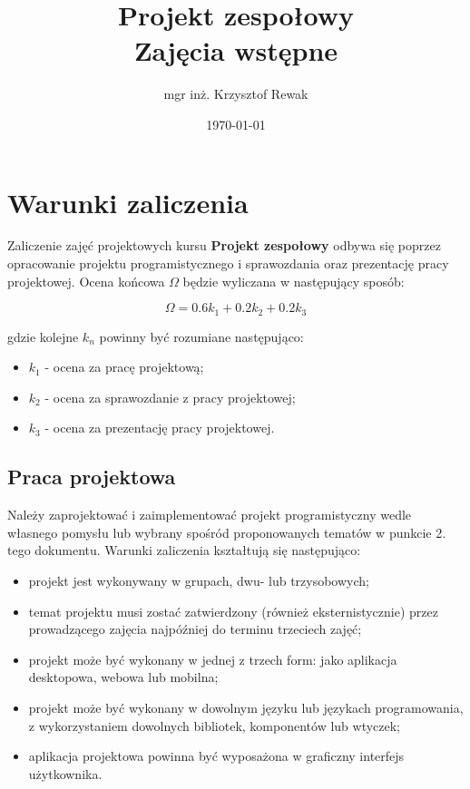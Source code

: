 \documentclass{article}
\title{
	Projekt zespołowy \\
	\Huge{Zajęcia wstępne}
}
\author{mgr inż. Krzysztof Rewak}
\date{\today}
\begin{document}
	\maketitle

	\section{Warunki zaliczenia}
	Zaliczenie zajęć projektowych kursu \textbf{Projekt zespołowy} odbywa się poprzez opracowanie projektu programistycznego i sprawozdania oraz prezentację pracy projektowej. Ocena końcowa $\Omega$ będzie wyliczana w następujący sposób:
	
	\begin{equation} \Omega = 0.6 k_1 + 0.2 k_2 + 0.2 k_3 \label{omega} \end{equation}
	
	gdzie kolejne $k_n$ powinny być rozumiane następująco:
	
	\begin{itemize}
		\item $k_1$ - ocena za pracę projektową;
		\item $k_2$ - ocena za sprawozdanie z pracy projektowej;
		\item $k_3$ - ocena za prezentację pracy projektowej.
	\end{itemize}
	
	\subsection{Praca projektowa}
	Należy zaprojektować i zaimplementować projekt programistyczny wedle własnego pomysłu lub wybrany spośród proponowanych tematów w punkcie 2. tego dokumentu. Warunki zaliczenia kształtują się następująco:
	
	\begin{itemize}
		\item projekt jest wykonywany w grupach, dwu- lub trzysobowych;
		\item temat projektu musi zostać zatwierdzony (również eksternistycznie) przez prowadzącego zajęcia najpóźniej do terminu trzeciech zajęć;
		\item projekt może być wykonany w jednej z trzech form: jako aplikacja desktopowa, webowa lub mobilna;
		\item projekt może być wykonany w dowolnym języku lub językach programowania, z wykorzystaniem dowolnych bibliotek, komponentów lub wtyczek;
		\item aplikacja projektowa powinna być wyposażona w graficzny interfejs użytkownika.
	\end{itemize}
	
\end{document}
